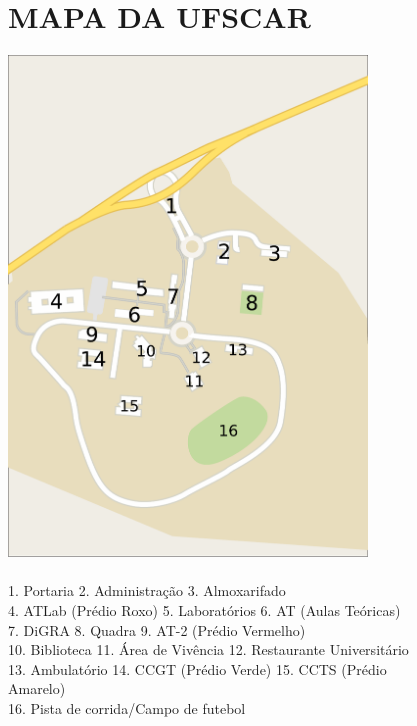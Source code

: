 \begin{figure}
  \section{MAPA DA UFSCAR}
  \centering
  \includegraphics[width=0.85\textwidth]{image.pdf}
  \caption{\\1. Portaria 2. Administração 3. Almoxarifado\\4. ATLab (Prédio Roxo) 5. Laboratórios 6. AT (Aulas Teóricas)\\7. DiGRA 8. Quadra 9. AT-2 (Prédio Vermelho)\\10. Biblioteca 11. Área de Vivência 12. Restaurante Universitário\\13. Ambulatório 14. CCGT (Prédio Verde) 15. CCTS (Prédio Amarelo)\\16. Pista de corrida/Campo de futebol}
\end{figure}
